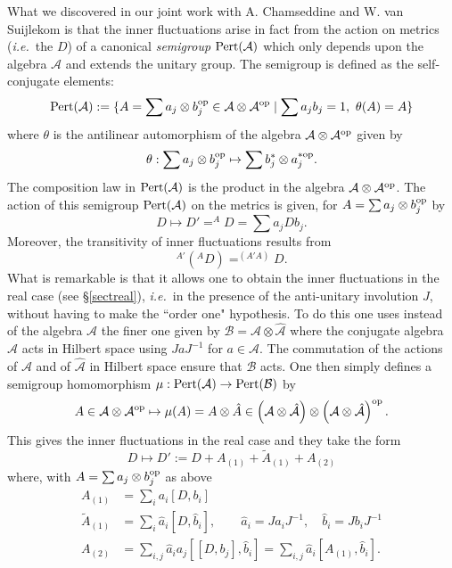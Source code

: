 \documentclass[12pt]{article}
\def\pert{{\rm Pert}}
\def\cA{{\mathcal A}}
\def\cB{{\mathcal B}}
\newcommand{\ie}{{\it i.e.\/}\ }
\begin{document}
What we discovered in our joint work with A. Chamseddine and W. van Suijlekom \cite{acinner} is that the inner fluctuations arise in fact from the action on metrics (\ie the $D$) of a canonical {\em semigroup} $\pert(\cA)$ which only depends upon the algebra $\cA$ and extends the unitary group.  The semigroup is defined as the self-conjugate elements:
$$
\pert(\cA):=\{A=\sum a_j\otimes b_j^{\rm op}\in  {\mathcal{A}}\otimes {\mathcal{A}}^{\rm op}\mid \sum a_jb_j=1, \ \theta(A)=A\}
$$ 
where $\theta$ is the antilinear automorphism of the algebra ${\mathcal{A}}\otimes {\mathcal{A}}^{\rm op}$ given by 
$$
\theta:\sum a_j\otimes b_j^{\rm op}\mapsto \sum b_j^*\otimes a_j^{*\rm op}.
$$
The composition law in $\pert(\cA)$ is the product in the algebra ${\mathcal{A}}\otimes {\mathcal{A}}^{\rm op}$. The action of this semigroup $\pert(\cA)$ on the metrics is given, for $A=\sum a_j\otimes b_j^{\rm op}$  by 
$$
D\mapsto D'=^{A}\!\!D= \sum a_j D b_j.
$$
Moreover, the transitivity of inner fluctuations results from 
$$
^{A'}\!(^{A}D)=^{(A'A)}\!D.
$$
 What is remarkable is that it allows one to obtain the inner fluctuations in the real case (see  \S\ref{sectreal}), \ie in the presence of the anti-unitary involution $J$, without having to make the ``order one" hypothesis. To do this one uses instead of the algebra $\cA$ the finer one given by $\cB={\mathcal{A}}\otimes \hat {\mathcal{A}} $ where the conjugate algebra $\hat {\mathcal{A}} $ acts in Hilbert space using $JaJ^{-1}$ for $a\in \cA$. The commutation of the actions of ${\mathcal{A}}$ and of $\hat {\mathcal{A}} $  in Hilbert space ensure that $\cB$ acts. One then  simply defines a semigroup homomorphism $\mu: \pert(\cA)\to \pert(\cB)$ by 
 $$
    A\in {\mathcal{A}}\otimes {\mathcal{A}}^{\rm op}\mapsto \mu(A)= A\otimes \hat A\in \left({\mathcal{A}}\otimes \hat {\mathcal{A}}\right)\otimes \left({\mathcal{A}}\otimes \hat {\mathcal{A}}\right)^{\rm op}.
$$
This gives the inner fluctuations in the real case and they take the form 
 \begin{equation*}
D\mapsto D':=D+A_{\left(  1\right)  }+\widetilde{A}_{\left(  1\right)  }+A_{\left(
2\right)  }%
\end{equation*}
where, with $A=\sum a_j\otimes b_j^{\rm op}$ as above 
\begin{align*}
A_{\left(  1\right)  }  &  =%
{\displaystyle\sum\limits_{i}}
a_{i}\left[  D,b_{i}\right] \\
\widetilde{A}_{\left(  1\right)  }  &  =%
{\displaystyle\sum\limits_{i}}
\hat{a}_{i}\left[  D,\hat{b}_{i}\right]  ,\qquad\hat{a}_{i}=Ja_{i}J^{-1}%
,\quad\hat{b}_{i}=Jb_{i}J^{-1}\\
A_{\left(  2\right)  }  &  =%
{\displaystyle\sum\limits_{i,j}}
\hat{a}_{i}a_{j}\left[  \left[  D,b_{j}\right]  ,\hat{b}_{i}\right]  =%
{\displaystyle\sum\limits_{i,j}}
\hat{a}_{i}\left[  A_{\left(  1\right)  },\hat{b}_{i}\right].
\end{align*}
\end{document}
